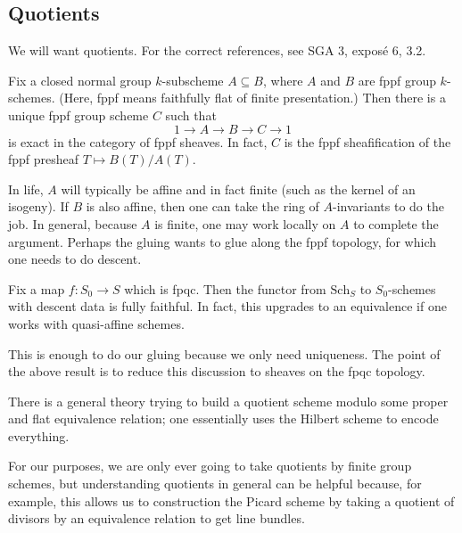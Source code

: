 \documentclass[../notes.tex]{subfiles}
\begin{document}
\subsection{Quotients}
We will want quotients. For the correct references, see SGA 3, expos\'e 6, 3.2.
\begin{theorem}
	Fix a closed normal group $k$-subscheme $A\subseteq B$, where $A$ and $B$ are fppf group $k$-schemes. (Here, fppf means faithfully flat of finite presentation.) Then there is a unique fppf group scheme $C$ such that
	\[1\to A\to B\to C\to1\]
	is exact in the category of fppf sheaves. In fact, $C$ is the fppf sheafification of the fppf presheaf $T\mapsto B(T)/A(T)$.
\end{theorem}
In life, $A$ will typically be affine and in fact finite (such as the kernel of an isogeny). If $B$ is also affine, then one can take the ring of $A$-invariants to do the job. In general, because $A$ is finite, one may work locally on $A$ to complete the argument. Perhaps the gluing wants to glue along the fppf topology, for which one needs to do descent.
\begin{theorem}
	Fix a map $f\colon S_0\to S$ which is fpqc. Then the functor from $\mathrm{Sch}_S$ to $S_0$-schemes with descent data is fully faithful. In fact, this upgrades to an equivalence if one works with quasi-affine schemes.
\end{theorem}
This is enough to do our gluing because we only need uniqueness. The point of the above result is to reduce this discussion to sheaves on the fpqc topology.
\begin{remark}
	There is a general theory trying to build a quotient scheme modulo some proper and flat equivalence relation; one essentially uses the Hilbert scheme to encode everything.
\end{remark}
For our purposes, we are only ever going to take quotients by finite group schemes, but understanding quotients in general can be helpful because, for example, this allows us to construction the Picard scheme by taking a quotient of divisors by an equivalence relation to get line bundles.
\end{document}
